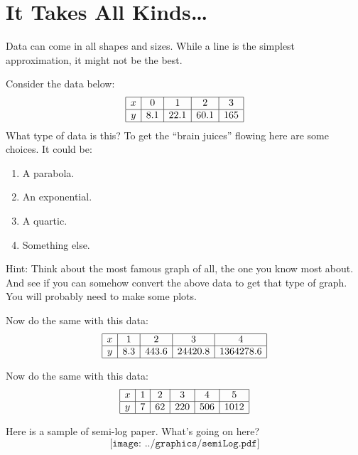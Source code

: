 \newpage
\section{It Takes All Kinds\dots}\label{A:otherCurves}

Data can come in all shapes and sizes. While a line is the simplest
approximation, it might not be the best.

\begin{prob}
Consider the data below:
\[
\begin{array}{|c|c|c|c|c|}\hline
x & 0 & 1 & 2 & 3 \\ \hline
y & 8.1 & 22.1 & 60.1 & 165 \\ \hline
\end{array}
\]
What type of data is this? To get the ``brain
juices'' flowing here are some choices. It could be:
\begin{enumerate}
\item A parabola.
\item An exponential.
\item A quartic.
\item Something else.
\end{enumerate}
Hint: Think about the most famous graph of all, the one you know most
about.  And see if you can somehow convert the above data to get that
type of graph. You will probably need to make some plots. 
\end{prob}


\begin{prob}
Now do the same with this data:
\[
\begin{array}{|c|c|c|c|c|}\hline
x & 1 & 2 & 3 & 4 \\ \hline
y & 8.3 & 443.6 & 24420.8 & 1364278.6 \\ \hline
\end{array}
\]
\end{prob}


\begin{prob}
Now do the same with this data:
\[
\begin{array}{|c|c|c|c|c|c|}\hline
x & 1 & 2 & 3 & 4 & 5 \\ \hline
y & 7 & 62 & 220 & 506 & 1012 \\ \hline 
\end{array}
\]
\end{prob}

\begin{prob}
Here is a sample of semi-log paper. What's going on here?
\[
\texttt{[image: ../graphics/semiLog.pdf]}
\]
\end{prob}
